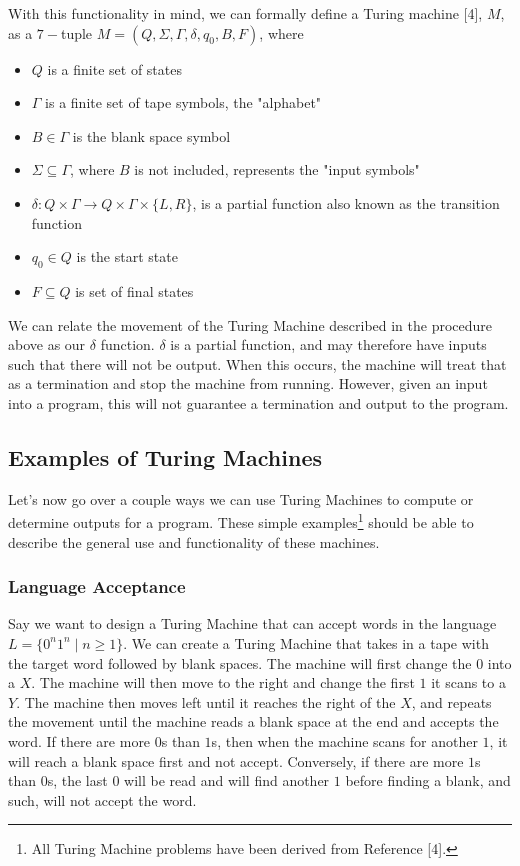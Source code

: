 \documentclass[12pt]{article}
\begin{document}
\noindent With this functionality in mind, we can formally define a Turing machine [4], $M$, as a $7-$tuple $M=(Q,\Sigma, \Gamma, \delta, q_0, B, F)$, where


\begin{itemize}

\item $Q$ is a finite set of states
\item $\Gamma$ is a finite set of tape symbols, the "alphabet"
\item $B \in \Gamma$ is the blank space symbol
\item $\Sigma \subseteq \Gamma$, where $B$ is not included, represents the "input symbols"
\item $\delta : Q \times \Gamma \to Q \times \Gamma \times \{L,R\}$, is a partial function also known as the transition function
\item $q_0 \in Q$ is the start state
\item $F \subseteq Q$ is set of final states

\end{itemize}

We can relate the movement of the Turing Machine described in the procedure above as our $\delta$ function. $\delta$ is a partial function, and may therefore have inputs such that there will not be output. When this occurs, the machine will treat that as a termination and stop the machine from running. However, given an input into a program, this will not guarantee a termination and output to the program.

\subsection{Examples of Turing Machines}

Let's now go over a couple ways we can use Turing Machines to compute or determine outputs for a program. These simple examples\footnote{All Turing Machine problems have been derived from Reference [4].} should be able to describe the general use and functionality of these machines.
\subsubsection*{Language Acceptance}

Say we want to design a Turing Machine that can accept words in the language $L = \{0^n1^n \mid n \geq 1 \}$. We can create a Turing Machine that takes in a tape with the target word followed by blank spaces. The machine will first change the $0$ into a $X$. The machine will then move to the right and change the first $1$ it scans to a $Y$. The machine then moves left until it reaches the right of the $X$, and repeats the movement until the machine reads a blank space at the end and accepts the word. If there are more $0$s than $1$s, then when the machine scans for another $1$, it will reach a blank space first and not accept. Conversely, if there are more $1$s than $0$s, the last $0$ will be read and will find another $1$ before finding a blank, and such, will not accept the word.
\end{document}

